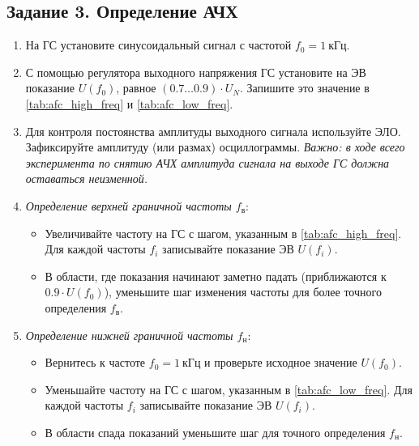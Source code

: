 \subsection*{Задание 3. Определение АЧХ}
\begin{enumerate}
    \item На ГС установите синусоидальный сигнал с частотой $f_0 = 1~\text{кГц}$.
    \item С помощью регулятора выходного напряжения ГС установите на ЭВ показание $U(f_0)$, равное $(0.7 \dots 0.9) \cdot U_N$. Запишите это значение в \cref{tab:afc_high_freq} и \cref{tab:afc_low_freq}.
    \item Для контроля постоянства амплитуды выходного сигнала используйте ЭЛО. Зафиксируйте амплитуду (или размах) осциллограммы. \textit{Важно: в ходе всего эксперимента по снятию АЧХ амплитуда сигнала на выходе ГС должна оставаться неизменной.}
    \item \textit{Определение верхней граничной частоты $f_\text{в}$}:
    \begin{itemize}
        \item Увеличивайте частоту на ГС с шагом, указанным в \cref{tab:afc_high_freq}. Для каждой частоты $f_i$ записывайте показание ЭВ $U(f_i)$.
        \item В области, где показания начинают заметно падать (приближаются к $0.9 \cdot U(f_0)$), уменьшите шаг изменения частоты для более точного определения $f_\text{в}$.
    \end{itemize}
    \item \textit{Определение нижней граничной частоты $f_\text{н}$}:
    \begin{itemize}
        \item Вернитесь к частоте $f_0 = 1~\text{кГц}$ и проверьте исходное значение $U(f_0)$.
        \item Уменьшайте частоту на ГС с шагом, указанным в \cref{tab:afc_low_freq}. Для каждой частоты $f_i$ записывайте показание ЭВ $U(f_i)$.
        \item В области спада показаний уменьшите шаг для точного определения $f_\text{н}$.
    \end{itemize}
\end{enumerate}

